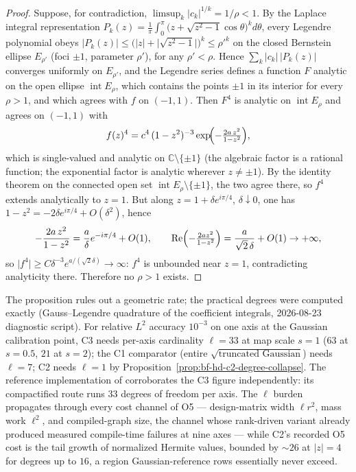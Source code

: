 \begin{proof}
Suppose, for contradiction,
\(\limsup_k\lvert c_k\rvert^{1/k}=1/\rho<1\).  By the Laplace integral
representation
\(P_k(z)=\frac1\pi\int_0^\pi\bigl(z+\sqrt{z^2-1}\cos\theta\bigr)^k
 d\theta\),
every Legendre polynomial obeys
\(\lvert P_k(z)\rvert\le\bigl(\lvert z\rvert+\lvert\sqrt{z^2-1}\rvert
\bigr)^k\le\rho'^k\) on the closed Bernstein ellipse
\(E_{\rho'}\) (foci \(\pm1\), parameter \(\rho'\)), for any
\(\rho'<\rho\).  Hence \(\sum_k\lvert c_k\rvert\,\lvert P_k(z)\rvert\)
converges uniformly on \(E_{\rho'}\), and the Legendre series defines a
function \(F\) analytic on the open ellipse \(\operatorname{int}E_\rho\),
which contains the points \(\pm1\) in its interior for every
\(\rho>1\), and which agrees with \(f\) on \((-1,1)\).  Then
\(F^4\) is analytic on \(\operatorname{int}E_\rho\) and agrees on
\((-1,1)\) with
\[
  f(z)^4=c^4\,(1-z^2)^{-3}\exp\!\Bigl(-\tfrac{2a\,z^2}{1-z^2}\Bigr),
\]
which is single-valued and analytic on \(\mathbb{C}\setminus\{\pm1\}\)
(the algebraic factor is a rational function; the exponential factor is
analytic wherever \(z\ne\pm1\)).  By the identity theorem on the
connected open set \(\operatorname{int}E_\rho\setminus\{\pm1\}\), the
two agree there, so \(f^4\) extends analytically to \(z=1\).  But along
\(z=1+\delta e^{i\pi/4}\), \(\delta\downarrow0\), one has
\(1-z^2=-2\delta e^{i\pi/4}+O(\delta^2)\), hence
\[
  -\frac{2a\,z^2}{1-z^2}
  =\frac{a}{\delta}e^{-i\pi/4}+O(1),
  \qquad
  \operatorname{Re}\Bigl(-\tfrac{2az^2}{1-z^2}\Bigr)
  =\frac{a}{\sqrt2\,\delta}+O(1)\to+\infty,
\]
so \(\lvert f^4\rvert\ge C\delta^{-3}e^{a/(\sqrt2\delta)}\to\infty\):
\(f^4\) is unbounded near \(z=1\), contradicting analyticity there.
Therefore no \(\rho>1\) exists.
\end{proof}

\begin{remark}
\label{rem:bf-hd-refdom-quant}
The proposition rules out a geometric rate; the practical degrees were
computed exactly (Gauss--Legendre quadrature of the coefficient
integrals, 2026-08-23 diagnostic script).  For relative \(L^2\) accuracy
\(10^{-3}\) on one axis at the Gaussian calibration point, C3 needs
per-axis cardinality \(\ell=33\) at map scale \(s=1\) (\(63\) at
\(s=0.5\), \(21\) at \(s=2\)); the C1 comparator (entire
\(\sqrt{\text{truncated Gaussian}}\)) needs \(\ell=7\); C2 needs
\(\ell=1\) by Proposition~\ref{prop:bf-hd-c2-degree-collapse}.  The
reference implementation of \citet{zhao2024ttsequential} corroborates
the C3 figure independently: its compactified route runs \(33\) degrees
of freedom per axis.  The \(\ell\) burden propagates through every cost
channel of O5 --- design-matrix width \(\ell r^2\), mass work
\(\ell^2\), and compiled-graph size, the channel whose rank-driven
variant already produced measured compile-time failures at nine axes ---
while C2's recorded O5 cost is the tail growth of normalized Hermite
values, bounded by \({\sim}26\) at \(\lvert z\rvert=4\) for degrees up
to \(16\), a region Gaussian-reference rows essentially never exceed.
\end{remark}

